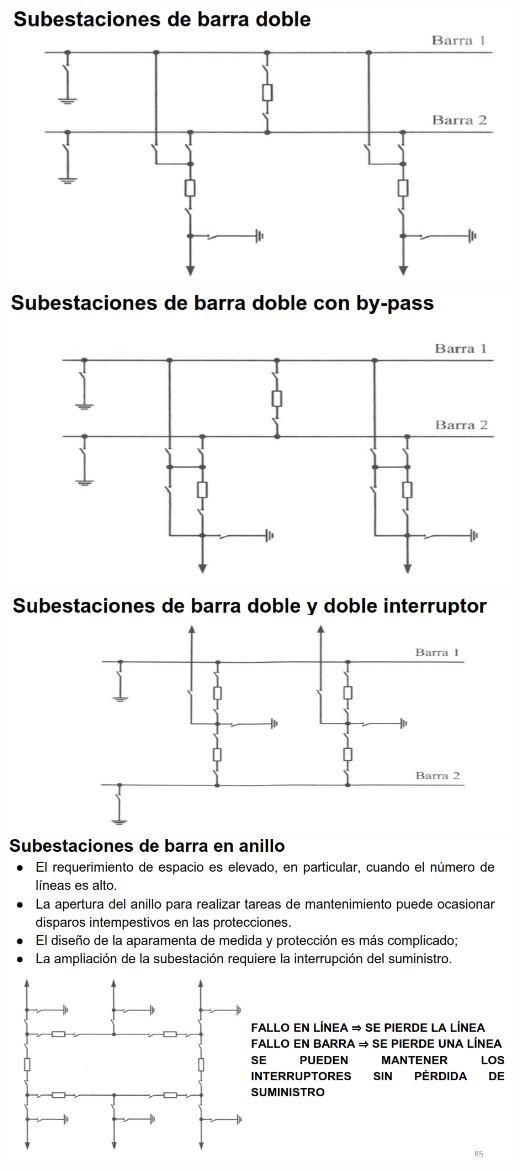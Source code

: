 \documentclass[10pt,a4paper]{article}
\begin{document}
\begin{center}
    \includegraphics[scale = 0.6]{7.png}
    \includegraphics[scale = 0.6]{8.png}
    \includegraphics[scale = 0.6]{9.png}
    \includegraphics[scale = 0.6]{10.png}

\end{center}
\end{document}
